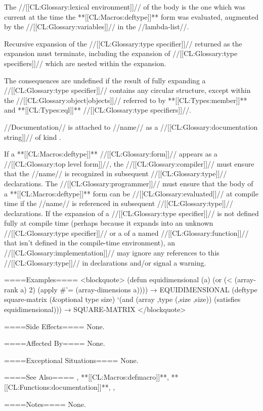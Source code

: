 The //[[CL:Glossary:lexical environment]]// of the body is the one which was current at the time the **[[CL:Macros:deftype]]** form was evaluated, augmented by the //[[CL:Glossary:variables]]// in the //lambda-list//.

Recursive expansion of the //[[CL:Glossary:type specifier]]// returned as the expansion must terminate, including the expansion of //[[CL:Glossary:type specifiers]]// which are nested within the expansion.

The consequences are undefined if the result of fully expanding a //[[CL:Glossary:type specifier]]// contains any circular structure, except within the //[[CL:Glossary:object|objects]]// referred to by **[[CL:Types:member]]** and **[[CL:Types:eql]]** //[[CL:Glossary:type specifiers]]//.

//Documentation// is attached to //name// as a //[[CL:Glossary:documentation string]]// of kind .

If a **[[CL:Macros:deftype]]** //[[CL:Glossary:form]]// appears as a //[[CL:Glossary:top level form]]//, the //[[CL:Glossary:compiler]]// must ensure that the //name// is recognized in subsequent //[[CL:Glossary:type]]// declarations. The //[[CL:Glossary:programmer]]// must ensure that the body of a **[[CL:Macros:deftype]]** form can be //[[CL:Glossary:evaluated]]// at compile time if the //name// is referenced in subsequent //[[CL:Glossary:type]]// declarations. If the expansion of a //[[CL:Glossary:type specifier]]// is not defined fully at compile time (perhaps because it expands into an unknown //[[CL:Glossary:type specifier]]// or a  of a named //[[CL:Glossary:function]]// that isn't defined in the compile-time environment), an //[[CL:Glossary:implementation]]// may ignore any references to this //[[CL:Glossary:type]]// in declarations and/or signal a warning.

====Examples====
<blockquote> (defun equidimensional (a) (or (< (array-rank a) 2) (apply #'= (array-dimensions a)))) → EQUIDIMENSIONAL (deftype square-matrix (&optional type size) `(and (array ,type (,size ,size)) (satisfies equidimensional))) → SQUARE-MATRIX </blockquote>

====Side Effects====
None.

====Affected By====
None.

====Exceptional Situations====
None.

====See Also====
, **[[CL:Macros:defmacro]]**, **[[CL:Functions:documentation]]**, {\secref\TypeSpecifiers}, {\secref\DocVsDecls}

====Notes====
None.

     
